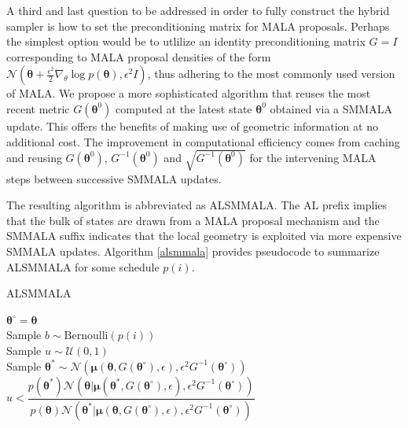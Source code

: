 \documentclass[twoside,11pt]{article}
\begin{document}
{A third and last question to be addressed in order to fully construct the hybrid sampler is how to set the preconditioning 
matrix for MALA proposals. Perhaps the simplest option would be to utlilize an identity 
preconditioning matrix $G=I$ corresponding to MALA proposal densities of the form
$\mathcal{N}(\boldsymbol{\theta}+\frac{\epsilon^2}{2}\nabla_{\theta}\log{p(\boldsymbol{\theta})}, \epsilon^2 I)$,
thus adhering to the most commonly used version of MALA.
We propose a more sophisticated algorithm that reuses the most recent metric $G(\boldsymbol{\theta}^0)$ computed at the 
latest state $\boldsymbol{\theta}^0$ obtained via a SMMALA update. This offers the benefits of making use of geometric information at no additional cost.  The improvement in computational efficiency comes from caching and reusing $G(\boldsymbol{\theta}^0)$, $G^{-1}(\boldsymbol{\theta}^0)$ and $\sqrt{G^{-1}(\boldsymbol{\theta}^0)}$ 
for the intervening MALA steps between successive SMMALA updates. 

The resulting algorithm is abbreviated as ALSMMALA. The AL prefix implies that the bulk of states are drawn from a MALA 
proposal mechanism and the SMMALA suffix indicates that the local geometry is exploited via more expensive SMMALA updates.
Algorithm \ref{alsmmala} provides pseudocode to summarize ALSMMALA for some schedule $p(i)$.

\begin{algorithm}[t]
	\caption{ALSMMALA}
	\label{alsmmala}
	\begin{algorithmic}
		\State $\boldsymbol{\theta}^{\circ}=\boldsymbol{\theta}$\\
		
		\State Sample $b \sim \mbox{Bernoulli}(p(i))$\\
		
		\State Sample $u\sim\mathcal{U}(0, 1)$\\
		
		 
		\State Sample 
		$\boldsymbol{\theta^{*}}
		\sim\mathcal{N}(\boldsymbol{\mu}(\boldsymbol{\theta}, G(\boldsymbol{\theta}^{\circ}), \epsilon),
		\epsilon^2 G^{-1}(\boldsymbol{\theta}^{\circ}))
		$\\
		
		\If
		{
			$u<\dfrac{
				p(\boldsymbol{\theta}^{*})
				\mathcal{N}(\boldsymbol{\theta}|
					\boldsymbol{\mu}(\boldsymbol{\theta}^{*},
					G(\boldsymbol{\theta}^{\circ}),
					\epsilon),
					\epsilon^2 G^{-1}(\boldsymbol{\theta}^{\circ}))
			}
			{
				p(\boldsymbol{\theta})
				\mathcal{N}(\boldsymbol{\theta}^{*}|
					\boldsymbol{\mu}(\boldsymbol{\theta},
					G(\boldsymbol{\theta}^{\circ}),
					\epsilon),
					\epsilon^2 G^{-1}(\boldsymbol{\theta}^{\circ}))
			}$
		}
		

\end{algorithmic}
\end{algorithm}}
\end{document}
